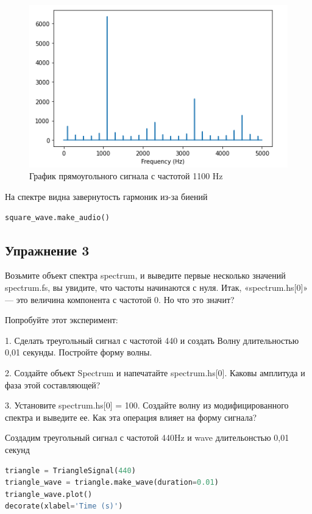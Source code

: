 \begin{figure}[H]
	\begin{center}
		\includegraphics[scale=1]{fig/lab02/lab02_07.png}
		\caption{График прямоугольного сигнала с частотой 1100 Hz}
	\end{center}
\end{figure}

На спектре видна завернутость гармоник из-за биений
\begin{lstlisting}[language=Python]
square_wave.make_audio()
\end{lstlisting}


\subsection{Упражнение 3}

Возьмите объект спектра spectrum, и выведите первые несколько значений spectrum.fs, вы увидите, что частоты начинаются с нуля. Итак, «spectrum.hs[0]» — это величина компонента с частотой 0. Но что это значит?

\noindent Попробуйте этот эксперимент:

1. Сделать треугольный сигнал с частотой 440 и создать Волну длительностью 0,01 секунды. Постройте форму волны.

2. Создайте объект Spectrum и напечатайте spectrum.hs[0]. Каковы амплитуда и фаза этой составляющей?

3. Установите spectrum.hs[0] = 100. Создайте волну из модифицированного спектра и выведите ее. Как эта операция влияет на форму сигнала?

Создадим треугольный сигнал с частотой 440Hz и wave длительонстью 0,01 секунд

\begin{lstlisting}[language=Python]
triangle = TriangleSignal(440)
triangle_wave = triangle.make_wave(duration=0.01)
triangle_wave.plot()
decorate(xlabel='Time (s)')
\end{lstlisting}

